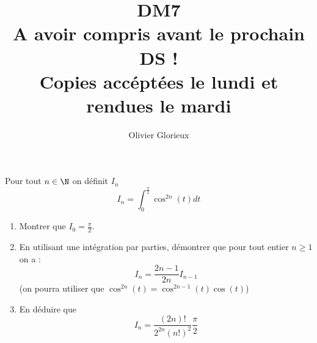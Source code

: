 \documentclass[a4paper, 11pt,reqno]{article}
\author{Olivier Glorieux}
\begin{document}
\title{DM7 \\
\small{A avoir compris avant le prochain DS ! \\
Copies accéptées le lundi et rendues le mardi
} 
}








%
%
%
\begin{exercice}
Pour tout $n\in \N$ on définit $I_n$ 
$$I_n = \int_0^{\frac{\pi}{2}} \cos^{2n}(t) dt $$
\begin{enumerate}
\item Montrer que $I_0= \frac{\pi}{2}$.
\item En utilisant une intégration par parties, démontrer que pour tout entier $n\geq 1$ on a :
$$I_n =\frac{2n-1}{2n} I_{n-1}$$
(on pourra utiliser que $\cos^{2n}(t)=\cos^{2n-1}(t)\cos(t)$)
\item En déduire que 
$$I_n = \frac{(2n)! }{2^{2n} (n!)^2} \frac{\pi}{2}$$
\end{enumerate}
\end{exercice}
\end{document}
